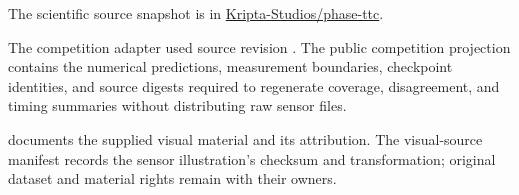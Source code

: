The scientific source snapshot is
 in
\href{https://github.com/Kripta-Studios/phase-ttc}{Kripta-Studios/phase-ttc}.

The competition adapter used source revision
. The public competition
projection contains the numerical predictions, measurement boundaries,
checkpoint identities, and source digests required to regenerate coverage,
disagreement, and timing summaries without distributing raw sensor files.

 documents the supplied visual material and its attribution.
The visual-source manifest records the sensor illustration's checksum and
transformation; original dataset and material rights remain with their owners.
